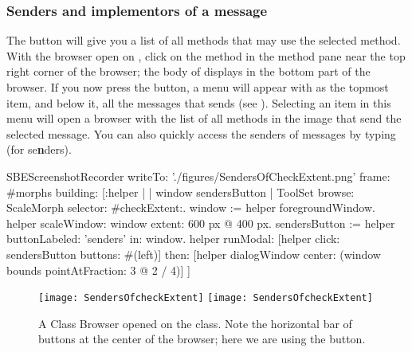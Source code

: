 \documentclass[a4paper,10pt,twoside]{book}
\begin{document}

\subsubsection{Senders and implementors of a message}
\label{sec:sendersImplementors}

The  button will give you a list of all methods that may use the selected method.
With the browser open on , click on the  method in the method pane near the top right corner of the browser; the body of  displays in the bottom part of the browser.
If you now press the  button, a menu will appear with  as the topmost item, and below it, all the messages that  sends (see ).
Selecting an item in this menu will open a browser with the list of all methods in the image that send the selected message.
You can also quickly access the senders of messages by typing  (for {se\textbf{n}ders}).

\begin{ExecuteSmalltalkScript}
SBEScreenshotRecorder writeTo: './figures/SendersOfCheckExtent.png' frame: #morphs building: [:helper |
	| window sendersButton |
	ToolSet browse: ScaleMorph selector: #checkExtent:.
	window := helper foregroundWindow.
	helper scaleWindow: window extent: 600 px @ 400 px.
	sendersButton := helper buttonLabeled: 'senders' in: window.
	helper
		runModal: [helper click: sendersButton buttons: #(left)]
		then: [helper dialogWindow center: (window bounds pointAtFraction: 3 @ 2 / 4)]
]
\end{ExecuteSmalltalkScript}
\begin{figure}[htbp]
	\begin{center}
   \ifluluelse
		{\texttt{[image: SendersOfcheckExtent]}}
		{\texttt{[image: SendersOfcheckExtent]}}
	\end{center}
	\caption{A Class Browser opened on the  class. Note the horizontal bar of buttons at the center of the browser; here we are using the  button.}
	\label{fig:SendersOfcheckExtent}
\end{figure}
\end{document}
